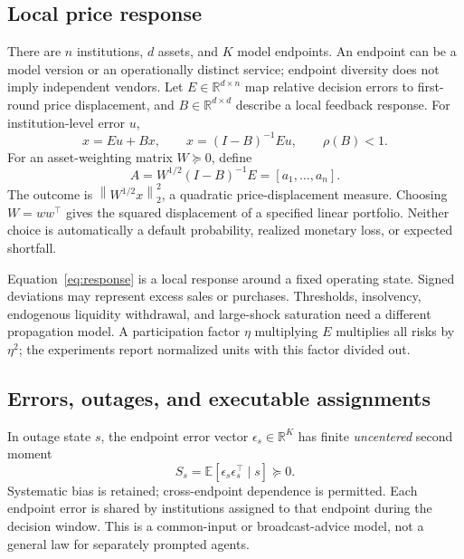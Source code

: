 \documentclass[11pt]{article}
\newcommand{\R}{\mathbb{R}}
\newcommand{\E}{\mathbb{E}}
\newcommand{\norm}[1]{\left\lVert#1\right\rVert}
\begin{document}
\subsection{Local price response}
There are \(n\) institutions, \(d\) assets, and \(K\) model endpoints. An endpoint can be a model version or an operationally distinct service; endpoint diversity does not imply independent vendors. Let \(E\in\R^{d\times n}\) map relative decision errors to first-round price displacement, and \(B\in\R^{d\times d}\) describe a local feedback response. For institution-level error \(u\),
\begin{equation}
 x=Eu+Bx,\qquad x=(I-B)^{-1}Eu,\qquad \rho(B)<1.
 \label{eq:response}
\end{equation}
For an asset-weighting matrix \(W\succeq0\), define
\begin{equation}
 A=W^{1/2}(I-B)^{-1}E=[a_1,\ldots,a_n].
 \label{eq:A}
\end{equation}
The outcome is \(\norm{W^{1/2}x}_2^2\), a quadratic price-displacement measure. Choosing \(W=ww^\top\) gives the squared displacement of a specified linear portfolio. Neither choice is automatically a default probability, realized monetary loss, or expected shortfall.

Equation~\eqref{eq:response} is a local response around a fixed operating state. Signed deviations may represent excess sales or purchases. Thresholds, insolvency, endogenous liquidity withdrawal, and large-shock saturation need a different propagation model. A participation factor \(\eta\) multiplying \(E\) multiplies all risks by \(\eta^2\); the experiments report normalized units with this factor divided out.

\subsection{Errors, outages, and executable assignments}
In outage state \(s\), the endpoint error vector \(\epsilon_s\in\R^K\) has finite \emph{uncentered} second moment
\begin{equation}
 S_s=\E[\epsilon_s\epsilon_s^\top\mid s]\succeq0.
 \label{eq:S}
\end{equation}
Systematic bias is retained; cross-endpoint dependence is permitted. Each endpoint error is shared by institutions assigned to that endpoint during the decision window. This is a common-input or broadcast-advice model, not a general law for separately prompted agents.
\end{document}
